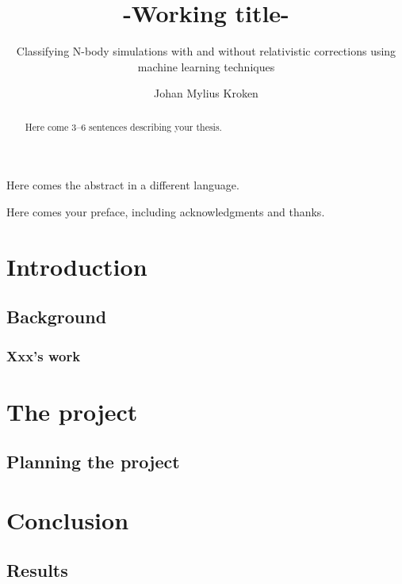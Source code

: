 \documentclass[UKenglish]{old_el_paso/uiomasterthesis}
\title{-Working title-}        %
\subtitle{Classifying N-body simulations with and without
relativistic corrections using machine learning
techniques}         %
\author{Johan Mylius Kroken}                      %
\begin{document}
\uiomasterfp[dept={Institute of Theoretical Astrophysics},  %
  program={Computational Science: Astrophysics},                        %
  supervisors={A David Fonseca Mota\and B Julian Adamek\and C Francisco Antonio Villaescusa Navarro},
  color=green,     %
  long]                                     %
\frontmatter{}
\begin{abstract}
  Here come 3--6 sentences describing your thesis.
\end{abstract}

\begin{xabstract}[Sammendrag]               %
  Here comes the abstract in a different language.
\end{xabstract}

\tableofcontents{}                          %
\listoffigures{}                            %
\listoftables{}                             %

\begin{preface}
  Here comes your preface, including acknowledgments and thanks.
\end{preface}

\mainmatter{}
\part{Introduction}                   %
\chapter{Background}                  %
\section{Xxx's work}                  %

\part{The project}                    %
\chapter{Planning the project}        %

\part{Conclusion}                     %
\chapter{Results}                     %

\backmatter{}
\end{document}
